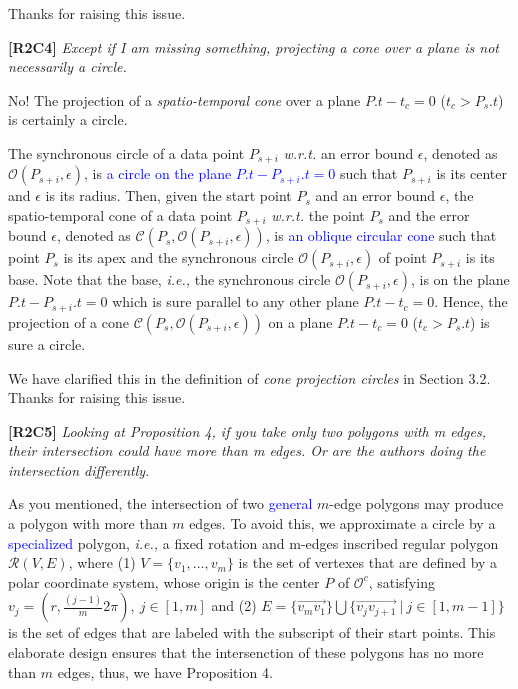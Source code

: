 \documentclass{letter}
\newcommand{\ie}{\emph{i.e.,}\xspace}
\newcommand{\wrt}{\emph{w.r.t.}\xspace}
\newcommand{\cone}[1]{{$\mathcal{C}{#1}$}}
\renewcommand{\circle}[1]{{$\mathcal{O}{#1}$}}
\newcommand{\pcircle}[1]{{$\mathcal{O}^c{#1}$}}
\begin{document}
Thanks for raising this issue.


\textbf{[R2C4]} \emph{Except if I am missing something, projecting a cone over a plane is not necessarily a circle.}

No! The projection of a \emph{spatio-temporal cone} over a plane $P.t- t_c = 0$ ($t_c > P_s.t$) is certainly a circle.

The synchronous circle of a data point $P_{s+i}$ \wrt an error bound $\epsilon$, denoted as \circle{(P_{s+i}, \epsilon)}, is \textcolor{blue}{a circle on the plane $P.t-P_{s+i}.t = 0$} such that $P_{s+i}$ is its center and $\epsilon$ is its radius.
%
Then, given the start point $P_s$ and an error bound $\epsilon$, the spatio-temporal cone of a data point $P_{s+i}$ \wrt the point $P_s$ and the error bound $\epsilon$, denoted as \cone{(P_s, \mathcal{O}(P_{s+i}, \epsilon))}, is \textcolor{blue}{an oblique circular cone} such that point $P_s$ is its apex and the synchronous circle $\mathcal{O}(P_{s+i}, \epsilon)$ of point $P_{s+i}$ is its base. Note that the base, \ie the synchronous circle $\mathcal{O}(P_{s+i}, \epsilon)$, is on the plane $P.t-P_{s+i}.t = 0$ which is sure parallel to any other plane $P.t- t_c = 0$. Hence, the  projection of a cone \cone{(P_s, \mathcal{O}(P_{s+i}, \epsilon))} on a plane $P.t- t_c = 0$ ($t_c > P_s.t$) is sure a circle.

We have clarified this in the definition of \emph{cone projection circles} in Section 3.2. Thanks for raising this issue.

\textbf{[R2C5]} \emph{Looking at Proposition 4, if you take only two polygons with m edges, their intersection could have more than m edges. Or are the authors doing the intersection differently.}

As you mentioned, the intersection of two \textcolor{blue}{general} $m$-edge polygons may produce a polygon with more than $m$ edges. To avoid this, we approximate a circle by a \textcolor{blue}{specialized} polygon, \ie a fixed rotation and m-edges inscribed regular polygon $\mathcal{R}(V, E)$,
where (1) $V=\{v_1, \ldots, v_{m}\}$ is the set of vertexes that are defined by a polar coordinate system, whose origin is the center $P$ of \pcircle{}, satisfying $v_j = (r, \frac{(j-1)}{m}2\pi), ~j \in [1, m]$
and (2) $E= \{\overrightarrow{v_mv_1}\} \bigcup \{\overrightarrow{v_jv_{j+1}}\ |\ j\in [1, m-1]\}$ is the set of edges that are labeled with the subscript of their start points.
This elaborate design ensures that the intersenction of these polygons has no more than $m$ edges, thus, we have Proposition 4.
\end{document}
